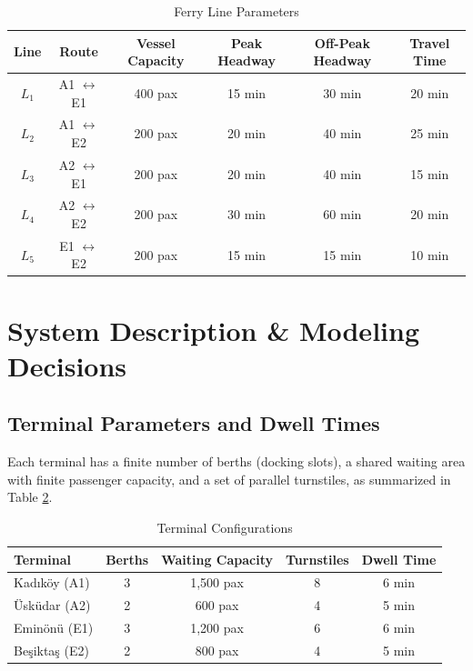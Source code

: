 \documentclass[11pt,a4paper]{article}
\begin{document}
\begin{table}[H]
\centering
\caption{Ferry Line Parameters}
\label{tab:ferry_lines}
\begin{tabular}{cccccc}
\toprule
\textbf{Line} & \textbf{Route} & \textbf{Vessel Capacity} & \textbf{Peak Headway} & \textbf{Off-Peak Headway} & \textbf{Travel Time} \\
\midrule
$L_1$ & A1 $\leftrightarrow$ E1 & 400 pax & 15 min & 30 min & 20 min \\
$L_2$ & A1 $\leftrightarrow$ E2 & 200 pax & 20 min & 40 min & 25 min \\
$L_3$ & A2 $\leftrightarrow$ E1 & 200 pax & 20 min & 40 min & 15 min \\
$L_4$ & A2 $\leftrightarrow$ E2 & 200 pax & 30 min & 60 min & 20 min \\
$L_5$ & E1 $\leftrightarrow$ E2 & 200 pax & 15 min & 15 min & 10 min \\
\bottomrule
\end{tabular}
\end{table}

\section{System Description \& Modeling Decisions}

\subsection{Terminal Parameters and Dwell Times}
Each terminal has a finite number of berths (docking slots), a shared waiting area with finite passenger capacity, and a set of parallel turnstiles, as summarized in Table \ref{tab:terminals}.

\begin{table}[H]
\centering
\caption{Terminal Configurations}
\label{tab:terminals}
\begin{tabular}{lcccc}
\toprule
\textbf{Terminal} & \textbf{Berths} & \textbf{Waiting Capacity} & \textbf{Turnstiles} & \textbf{Dwell Time} \\
\midrule
Kad\i k\"{o}y (A1)   & 3 & 1,500 pax & 8 & 6 min \\
\"Usk\"{u}dar (A2)  & 2 & 600 pax   & 4 & 5 min \\
Emin\"{o}n\"{u} (E1) & 3 & 1,200 pax & 6 & 6 min \\
Be\c{s}ikta\c{s} (E2) & 2 & 800 pax   & 4 & 5 min \\
\bottomrule
\end{tabular}
\end{table}
\end{document}
